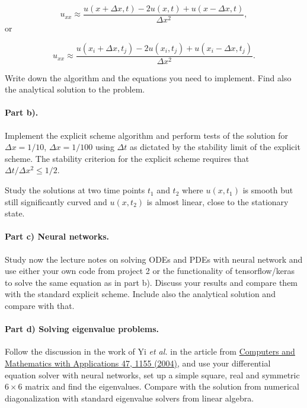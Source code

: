\documentclass[%
oneside,                 %
final,                   %
10pt]{article}
\begin{document}
\begin{equation*}
u_{xx}\approx \frac{u(x+\Delta x,t)-2u(x,t)+u(x-\Delta x,t)}{\Delta x^2},
\end{equation*}
or

\begin{equation*}
u_{xx}\approx \frac{u(x_i+\Delta x,t_j)-2u(x_i,t_j)+u(x_i-\Delta x,t_j)}{\Delta x^2}.
\end{equation*}

Write down the algorithm and the equations you need to implement.
Find also the analytical solution to the problem. 

\paragraph{Part b).}
Implement the explicit scheme  algorithm and perform tests of the solution 
for $\Delta x=1/10$, $\Delta x=1/100$ using  $\Delta t$ as dictated by the stability limit of the explicit scheme. The stability criterion for the explicit scheme requires that $\Delta t/\Delta x^2 \leq 1/2$. 

Study the solutions at two time points $t_1$ and $t_2$ where $u(x,t_1)$ is smooth but still significantly curved
and $u(x,t_2)$ is almost linear, close to the stationary state.

\paragraph{Part c) Neural networks.}
Study now the lecture notes on solving ODEs and PDEs with neural
network and use either your own code from project 2 or the
functionality of tensorflow/keras to solve the same equation as in
part b).  Discuss your results and compare them with the standard
explicit scheme. Include also the analytical solution and compare with
that.

\paragraph{Part d) Solving eigenvalue problems.}
Follow the discussion in the work of Yi \emph{et al.} in the article from
\href{{https://www.sciencedirect.com/science/article/pii/S0898122104901101}}{Computers and Mathematics with Applications 47, 1155 (2004)}, and
use your differential equation solver with neural networks, set up a
simple square, real and symmetric $6\times 6$ matrix and find the
eigenvalues. Compare with the solution from numerical diagonalization with standard eigenvalue solvers from linear algebra.
\end{document}
